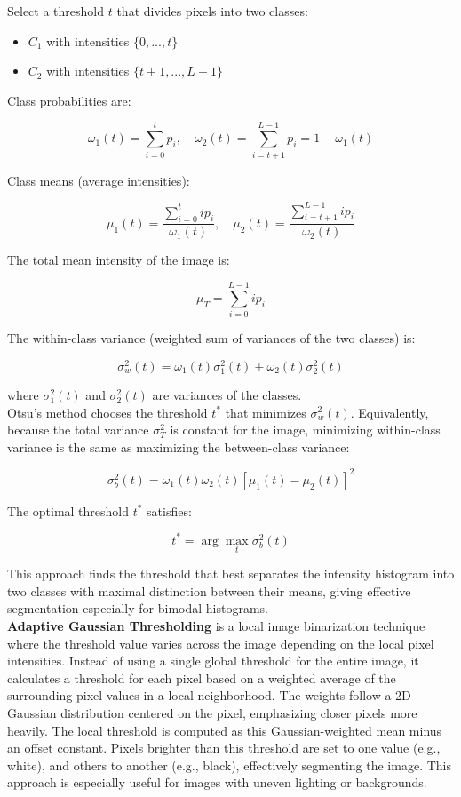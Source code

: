 \documentclass{article}
\begin{document}
Select a threshold \( t \) that divides pixels into two classes:

\begin{itemize}
    \item \( C_1 \) with intensities \(\{0, ..., t\}\)
    \item \( C_2 \) with intensities \(\{t + 1, ..., L - 1\}\)
\end{itemize}

Class probabilities are:

\[
\omega_1(t) = \sum_{i=0}^t p_i, \quad \omega_2(t) = \sum_{i=t+1}^{L-1} p_i = 1 - \omega_1(t)
\]

Class means (average intensities):

\[
\mu_1(t) = \frac{\sum_{i=0}^t i p_i}{\omega_1(t)}, \quad \mu_2(t) = \frac{\sum_{i=t+1}^{L-1} i p_i}{\omega_2(t)}
\]

The total mean intensity of the image is:

\[
\mu_T = \sum_{i=0}^{L-1} i p_i
\]

The within-class variance (weighted sum of variances of the two classes) is:

\[
\sigma_w^2(t) = \omega_1(t) \sigma_1^2(t) + \omega_2(t) \sigma_2^2(t)
\]

where \(\sigma_1^2(t)\) and \(\sigma_2^2(t)\) are variances of the classes.\\

Otsu's method chooses the threshold \( t^* \) that minimizes \(\sigma_w^2(t)\). Equivalently, because the total variance \(\sigma_T^2\) is constant for the image, minimizing within-class variance is the same as maximizing the between-class variance:

\[
\sigma_b^2(t) = \omega_1(t) \omega_2(t) [\mu_1(t) - \mu_2(t)]^2
\]

The optimal threshold \( t^* \) satisfies:

\[
t^* = \arg \max_t \sigma_b^2(t)
\]

This approach finds the threshold that best separates the intensity histogram into two classes with maximal distinction between their means, giving effective segmentation especially for bimodal histograms.\\

\textbf{Adaptive Gaussian Thresholding} is a local image binarization technique where the threshold value varies across the image depending on the local pixel intensities. Instead of using a single global threshold for the entire image, it calculates a threshold for each pixel based on a weighted average of the surrounding pixel values in a local neighborhood. The weights follow a 2D Gaussian distribution centered on the pixel, emphasizing closer pixels more heavily. The local threshold is computed as this Gaussian-weighted mean minus an offset constant. Pixels brighter than this threshold are set to one value (e.g., white), and others to another (e.g., black), effectively segmenting the image. This approach is especially useful for images with uneven lighting or backgrounds.\\
\end{document}
